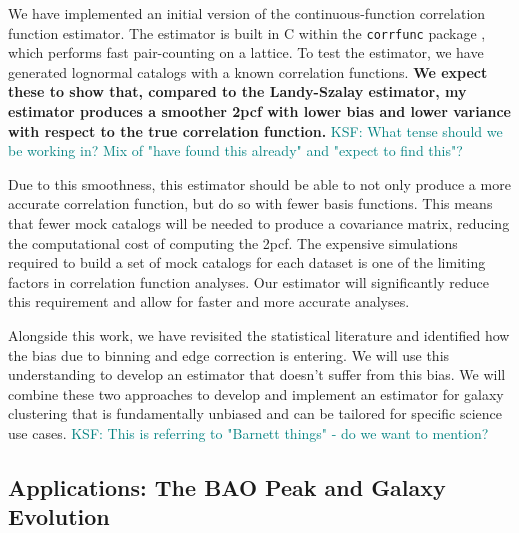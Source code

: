 \documentclass[12pt, fullpage, letterpaper]{article}
\newcommand{\KSF}[1]{\textcolor{teal}{KSF: #1}}
\newcommand{\cf}{2pcf\xspace}
\begin{document}
We have implemented an initial version of the continuous-function correlation function estimator.
The estimator is built in C within the \texttt{corrfunc} package \citep{Sinha2017}, which performs fast pair-counting on a lattice.
To test the estimator, we have generated lognormal catalogs with a known correlation functions. 
\textbf{We expect these to show that, compared to the Landy-Szalay estimator, my estimator produces a smoother \cf with lower bias and lower variance with respect to the true correlation function.} \KSF{What tense should we be working in? Mix of "have found this already" and "expect to find this"?}

Due to this smoothness, this estimator should be able to not only produce a more accurate correlation function, but do so with fewer basis functions.
This means that fewer mock catalogs will be needed to produce a covariance matrix, reducing the computational cost of computing the \cf.
The expensive simulations required to build a set of mock catalogs for each dataset is one of the limiting factors in correlation function analyses.
Our estimator will significantly reduce this requirement and allow for faster and more accurate analyses.

Alongside this work, we have revisited the statistical literature and identified how the bias due to binning and edge correction is entering. 
We will use this understanding to develop an estimator that doesn't suffer from this bias.
We will combine these two approaches to develop and implement an estimator for galaxy clustering that is fundamentally unbiased and can be tailored for specific science use cases.
\KSF{This is referring to "Barnett things" - do we want to mention?}

\subsection{Applications: The BAO Peak and Galaxy Evolution}
\end{document}
